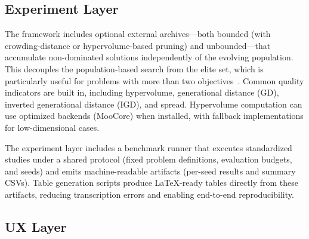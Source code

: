 \documentclass[journal]{IEEEtran}
\begin{document}
\subsection{Experiment Layer}


The framework includes optional external archives---both bounded (with crowding-distance or hypervolume-based pruning) and unbounded---that accumulate non-dominated solutions independently of the evolving population. This decouples the population-based search from the elite set, which is particularly useful for problems with more than two objectives~\cite{IPS20}. Common quality indicators are built in, including hypervolume, generational distance (GD), inverted generational distance (IGD), and spread. Hypervolume computation can use optimized backends (MooCore) when installed, with fallback implementations for low-dimensional cases.


The experiment layer includes a benchmark runner that executes standardized studies under a shared protocol (fixed problem definitions, evaluation budgets, and seeds) and emits machine-readable artifacts (per-seed results and summary CSVs). Table generation scripts produce LaTeX-ready tables directly from these artifacts, reducing transcription errors and enabling end-to-end reproducibility.

\subsection{UX Layer}

\end{document}
